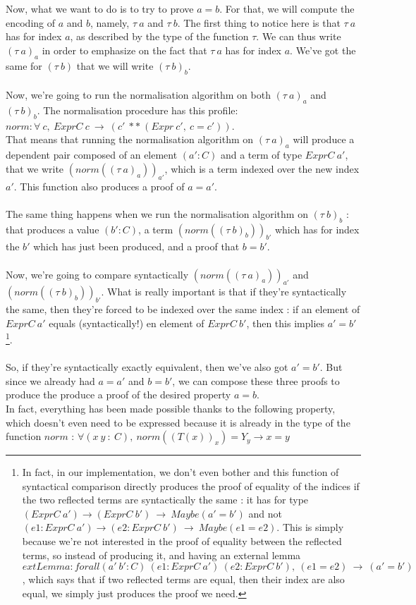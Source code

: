 \documentclass{llncs}
\begin{document}
\\
\\
Now, what we want to do is to try to prove $a=b$. For that, we will compute the encoding of $a$ and $b$, namely, $\tau\ a$ and $\tau\ b$.  The first thing to notice here is that $\tau\ a$ has for index $a$, as described by the type of the function $\tau$. We can thus write $(\tau\ a)_a$ in order to emphasize on the fact that $\tau\ a$ has for index $a$. We've got the same for $(\tau\ b)$ that we will write $(\tau\ b)_b$.
\\
\\
Now, we're going to run the normalisation algorithm on both $(\tau\ a)_a$ and $(\tau\ b)_b$. The normalisation procedure has this profile: \\
$norm : \forall\ c,\ ExprC\ c\ \rightarrow\ (c'\ **\ (Expr\ c',\ c=c'))$. \\
That means that running the normalisation algorithm on $(\tau\ a)_a$ will produce a dependent pair composed of an element $(a':C)$ and a term of type $ExprC \ a'$, that we write $(norm((\tau\ a)_a))_{a'}$, which is a term indexed over the new index $a'$. This function also produces a proof of $a=a'$.
\\
\\
The same thing happens when we run the normalisation algorithm on $(\tau\ b)_b$ : that produces a value $(b':C)$, a term $(norm((\tau\ b)_b))_{b'}$ which has for index the $b'$ which has just been produced, and a proof that $b=b'$.
\\
\\
Now, we're going to compare syntactically $(norm((\tau\ a)_a))_{a'}$ and $(norm((\tau\ b)_b))_{b'}$. What is really important is that if they're syntactically the same, then they're forced to be indexed over the same index : if an element of $ExprC\ a'$ equals (syntactically!) en element of $ExprC\ b'$, then this implies $a'=b'$\footnote{In fact, in our implementation, we don't even bother and this function of syntactical comparison directly produces the proof of equality of the indices if the two reflected terms are syntactically the same : it has for type $(ExprC\ a') \rightarrow (ExprC\ b')\ \rightarrow\ Maybe(a'=b')$ and not $(e1:ExprC\ a') \rightarrow (e2:ExprC\ b')\ \rightarrow\ Maybe(e1=e2)$. This is simply because we're not interested in the proof of equality between the reflected terms, so instead of producing it, and having an external lemma $extLemma:forall (a'\ b':C)\ (e1:ExprC\ a')\ (e2:ExprC\ b'),\ (e1=e2)\ \rightarrow\ (a'=b')$, which says that if two reflected terms are equal, then their index are also equal, we simply just produces the proof we need.}.
\\
\\
So, if they're syntactically exactly equivalent, then we've also got $a'=b'$. But since we already had $a=a'$ and $b=b'$, we can compose these three proofs to produce the produce a proof of the desired property $a=b$. 
\\
In fact, everything has been made possible thanks to the following property, which doesn't even need to be expressed because it is already in the type of the function $norm$ :
$\forall (x\ y\ :\ C),\ norm ((T(x))_x) = Y_y \rightarrow x = y$
\end{document}
